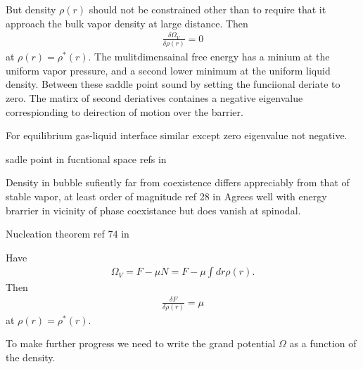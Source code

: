 {But density $\rho(r)$ should not be constrained other than to require that it approach the bulk vapor density at large distance.
Then 
\begin{align}
  \frac{\delta \Omega_V}{\delta \rho(r)} = 0
\end{align}
at $\rho(r) = \rho^\ast(r)$.
The mulitdimensainal free energy has a minium at the uniform vapor pressure,
and a second lower minimum at the  uniform liquid density. Between these saddle point sound by setting the funciional deriate to zero.
The matirx of second deriatives containes a negative eigenvalue correspionding to deirection of motion over the barrier.

For equilibrium gas-liquid interface similar except zero eigenvalue not negative. 

sadle point in fucntional space refs in \cite{shen2003}

Density in bubble sufiently far from coexistence differs appreciably from that of stable vapor,
at least order of magnitude ref 28 in \cite{Shen2003}
Agrees well with energy brarrier in vicinity of phase coexistance but does vanish at spinodal.

Nucleation theorem ref 74 in \cite{shen2003}

Have
\begin{align}
\Omega_V = F - \mu N = F - \mu \int dr \rho(r).
\end{align}
Then \begin{align}
\frac{\delta F}{\delta \rho(r)} = \mu
\end{align}
at $\rho(r) = \rho^\ast(r)$.


To make further progress we need to write the grand potential $\Omega$ as a function of the density.

}

